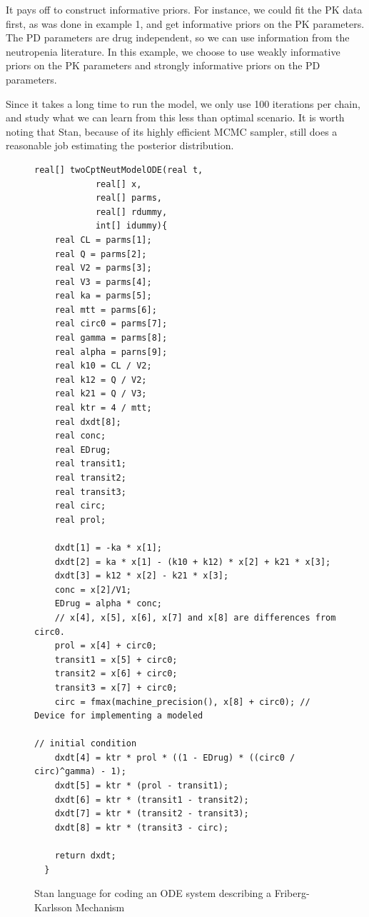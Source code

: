 \documentclass[11pt]{amsart}
\newenvironment{fmpage}[1]
     {\begin{lrbox}{\fmbox}\begin{minipage}{#1}}
     {\end{minipage}\end{lrbox}\fbox{\usebox{\fmbox}}}
\begin{document}
It pays off to construct informative priors. For instance, we could fit the PK data first, as was done in  example 1, and get informative priors on the PK parameters. The PD parameters are drug independent, so we can use information from the neutropenia literature. In this example, we choose to use weakly informative priors on the PK parameters and strongly informative priors on the PD parameters. 

Since it takes a long time to run the model, we only use 100 iterations per chain, and study what we can learn from this less than optimal scenario. It is worth noting that Stan, because of its highly efficient MCMC sampler, still does a reasonable job estimating the posterior distribution.

\begin{figure}
\caption{Stan language for coding an ODE system describing a Friberg-Karlsson Mechanism}
\begin{tiny}
\begin{center}
\begin{fmpage}{\textwidth - .75in}
\begin{lstlisting}[basicstyle=\tiny\ttfamily,mathescape=true,flexiblecolumns=true,frame=single,escapeinside=`']
    real[] twoCptNeutModelODE(real t,
			real[] x,
			real[] parms,
			real[] rdummy,
			int[] idummy){
    real CL = parms[1];
    real Q = parms[2];
    real V2 = parms[3];
    real V3 = parms[4];
    real ka = parms[5];
    real mtt = parms[6];
    real circ0 = parms[7];
    real gamma = parms[8];
    real alpha = parns[9];
    real k10 = CL / V2;
    real k12 = Q / V2;
    real k21 = Q / V3;
    real ktr = 4 / mtt;
    real dxdt[8];
    real conc;
    real EDrug;
    real transit1;
    real transit2;
    real transit3;
    real circ;
    real prol;
  
    dxdt[1] = -ka * x[1];
    dxdt[2] = ka * x[1] - (k10 + k12) * x[2] + k21 * x[3];
    dxdt[3] = k12 * x[2] - k21 * x[3];
    conc = x[2]/V1;
    EDrug = alpha * conc;
    // x[4], x[5], x[6], x[7] and x[8] are differences from circ0.
    prol = x[4] + circ0;
    transit1 = x[5] + circ0;
    transit2 = x[6] + circ0;
    transit3 = x[7] + circ0;
    circ = fmax(machine_precision(), x[8] + circ0); // Device for implementing a modeled 
                                                                              // initial condition
    dxdt[4] = ktr * prol * ((1 - EDrug) * ((circ0 / circ)^gamma) - 1);
    dxdt[5] = ktr * (prol - transit1);
    dxdt[6] = ktr * (transit1 - transit2);
    dxdt[7] = ktr * (transit2 - transit3);
    dxdt[8] = ktr * (transit3 - circ);

    return dxdt;
  }
\end{lstlisting}
\end{fmpage}
\end{center}
\end{tiny} 
\label{FKODECode}
\end{figure}
\end{document}
